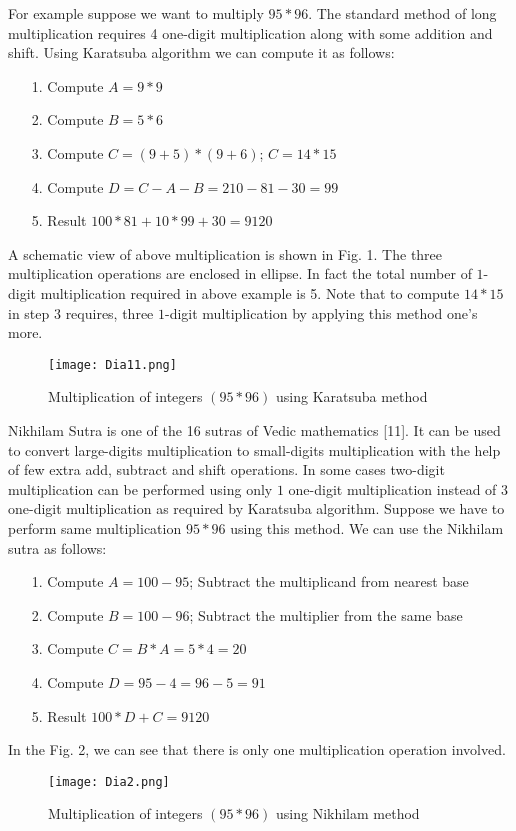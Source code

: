 \documentclass[conference]{IEEEtran}
\begin{document}
For example suppose we want to multiply $95 * 96$. The standard method of long multiplication requires 4 one-digit multiplication along with some addition and shift. Using Karatsuba algorithm we can compute it as follows:
\begin{enumerate}
 \item[1.] Compute $A = 9*9$
 \item[2.] Compute $B = 5*6$
 \item[3.] Compute $C = (9 + 5)*(9 + 6)$; $C= 14*15$
 \item[4.] Compute $D = C-A-B= 210-81-30=99$ 
 \item[5.] Result  $100*81 + 10*99 +30= 9120$
\end{enumerate}
A schematic view of above multiplication is shown in Fig. 1. The three multiplication operations are enclosed in ellipse.  In fact the total number of $1$-digit multiplication required in above example is 5. Note that to compute $14*15$ in step $3$ requires, three $1$-digit multiplication by applying this method one's more. 
\begin{figure}[ht]
\begin{center}
\texttt{[image: Dia11.png]}
\end{center}
\caption{Multiplication of integers $(95*96)$ using Karatsuba method}
\label{graph1}
\end{figure}

\indent Nikhilam Sutra is one of the 16 sutras of Vedic mathematics [11]. It can be used to convert large-digits multiplication to small-digits multiplication with the help of few extra add, subtract and shift operations. In some cases two-digit multiplication can be performed using only $1$ one-digit multiplication instead of $3$ one-digit multiplication as required by Karatsuba algorithm.
Suppose we have to perform same multiplication $95 * 96$ using this method. We can use the Nikhilam sutra as follows:
\begin{enumerate}
 \item[1.] Compute $A = 100-95$; Subtract the multiplicand from nearest base 
 \item[2.] Compute $B = 100-96$; Subtract the multiplier from the same base
 \item[3.] Compute $C = B*A=5*4=20 $
 \item[4.] Compute $D = 95-4=96-5=91$ 
 \item[5.] Result  $100*D + C = 9120$
\end{enumerate}

In the Fig. 2, we can see that there is only one multiplication operation involved.
\begin{figure}[ht]
\begin{center}
\texttt{[image: Dia2.png]}
\end{center}
\caption{Multiplication of integers $(95*96)$ using Nikhilam method}
\label{graph1}
\end{figure}
\end{document}
